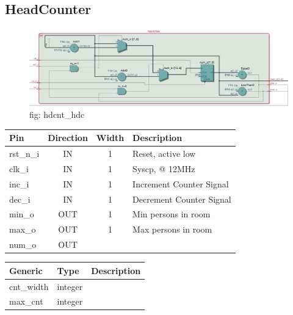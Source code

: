 \documentclass[12pt,a4 paper] {report}
\begin{document}
\subsection{HeadCounter}
\begin{figure}[h]
	\centering	
	\includegraphics[scale=0.3]{../png/hdcnt_hdc.png}
	\newline
	fig: hdcnt\_hdc \\
\end{figure}
\begin{center}
	\begin{tabular}{ | p{2cm} | c | c | p{5cm} |}
		\hline
		\textbf{Pin} & \textbf{Direction} & \textbf{Width} & \textbf{Description} \\
		\hline	
		rst\_n\_i & IN & 1 & Reset, active low \\
		\hline
		clk\_i & IN & 1 & Syscp, @ 12MHz \\
		\hline
		inc\_i & IN & 1 & Increment Counter Signal \\
		\hline
		dec\_i & IN & 1 & Decrement Counter Signal \\
		\hline
		min\_o & OUT & 1 & Min persons in room \\
		\hline
		max\_o & OUT & 1 & Max persons in room \\
		\hline
		num\_o & OUT &  & \\
		\hline
	\end{tabular}
\end{center}
\begin{center}
	\begin{tabular}{| p{2cm} | p{2cm} | p{4cm} |}
		\hline
		\textbf{Generic} & \textbf{Type} & \textbf{Description} \\
		\hline
		cnt\_width & integer & \\
		\hline
		max\_cnt & integer & \\
		\hline
	\end{tabular}	
\end{center}


\newpage
\end{document}

